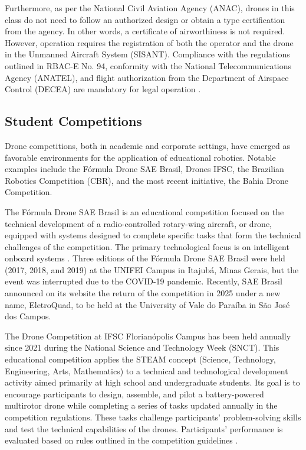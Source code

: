 \documentclass[conference]{IEEEtran}
\begin{document}
Furthermore, as per the National Civil Aviation Agency (ANAC), drones in this class do not need to follow an authorized design or obtain a type certification from the agency. In other words, a certificate of airworthiness is not required. However, operation requires the registration of both the operator and the drone in the Unmanned Aircraft System (SISANT). Compliance with the regulations outlined in RBAC-E No. 94, conformity with the National Telecommunications Agency (ANATEL), and flight authorization from the Department of Airspace Control (DECEA) are mandatory for legal operation \cite{b2}.

\subsection{Student Competitions}

Drone competitions, both in academic and corporate settings, have emerged as favorable environments for the application of educational robotics. Notable examples include the Fórmula Drone SAE Brasil, Drones IFSC, the Brazilian Robotics Competition (CBR), and the most recent initiative, the Bahia Drone Competition.

The Fórmula Drone SAE Brasil is an educational competition focused on the technical development of a radio-controlled rotary-wing aircraft, or drone, equipped with systems designed to complete specific tasks that form the technical challenges of the competition. The primary technological focus is on intelligent onboard systems \cite{b7}. Three editions of the Fórmula Drone SAE Brasil were held (2017, 2018, and 2019) at the UNIFEI Campus in Itajubá, Minas Gerais, but the event was interrupted due to the COVID-19 pandemic. Recently, SAE Brasil announced on its website the return of the competition in 2025 under a new name, EletroQuad, to be held at the University of Vale do Paraíba in São José dos Campos.

The Drone Competition at IFSC Florianópolis Campus has been held annually since 2021 during the National Science and Technology Week (SNCT). This educational competition applies the STEAM concept (Science, Technology, Engineering, Arts, Mathematics) to a technical and technological development activity aimed primarily at high school and undergraduate students. Its goal is to encourage participants to design, assemble, and pilot a battery-powered multirotor drone while completing a series of tasks updated annually in the competition regulations. These tasks challenge participants' problem-solving skills and test the technical capabilities of the drones. Participants' performance is evaluated based on rules outlined in the competition guidelines \cite{b4}.
\end{document}
